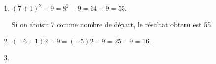 
\medskip

%

\begin{enumerate}
\item %
$(7 + 1)^2 - 9 = 8^2 - 9 = 64 - 9 = 55$.

Si on choisit 7 comme nombre de départ, le résultat obtenu est 55.
\item %
$(- 6 + 1)2 - 9 = (- 5)2 -  9 = 25 - 9 = 16$.

\item %



\end{enumerate}
